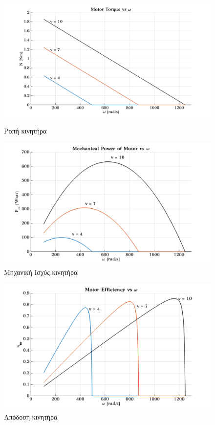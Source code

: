 \begin{figure}[hbt!]
    \begin{minipage}[b]{0.48\linewidth}
        \centering
        \includegraphics[width=\textwidth]{Motor/fig_N_omega.png}
        \caption{Ροπή κινητήρα}
        \label{fig_Nw}
    \end{minipage}
    \quad
    \begin{minipage}[b]{0.48\linewidth}
        \centering
        \includegraphics[width=\textwidth]{Motor/fig_Pm_omega.png}
        \caption{Μηχανική Ισχύς κινητήρα}
        \label{fig_Pmw}
    \end{minipage}
\end{figure}
\begin{figure}[H]
    \centering
    \includegraphics[scale=0.3]{Motor/fig_nm_omega.png}
    \caption{Απόδοση κινητήρα}
    \label{fig_nmw}
\end{figure}

